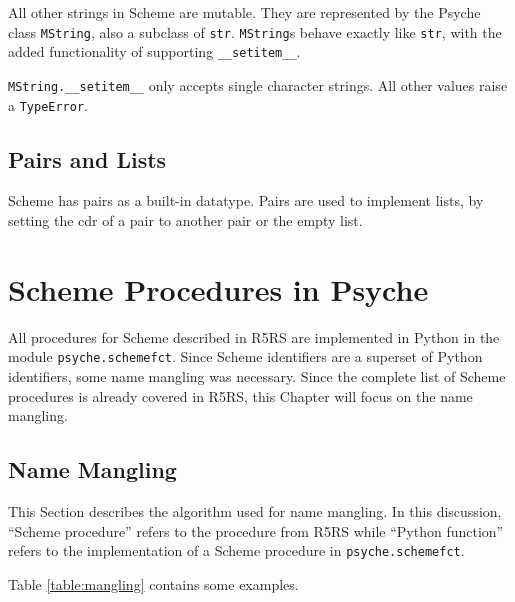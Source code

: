 \documentclass{report}
\newcommand{\code}[1]{\texttt{#1}}
\newcommand{\file}[1]{\texttt{#1}}
\begin{document}
All other strings in Scheme are mutable. They are represented by the
Psyche class \code{MString}, also a subclass of
\code{str}. \code{MString}s behave exactly like \code{str}, with
the added functionality of supporting \code{\_\_setitem\_\_}. 

\code{MString.\_\_setitem\_\_} only accepts single character
strings. All other values raise a \code{TypeError}.


\section{Pairs and Lists}

Scheme has pairs as a built-in datatype. Pairs are used to implement
lists, by setting the cdr of a pair to another pair or the empty
list. 

%
%
\chapter{Scheme Procedures in Psyche}
\label{chap:procedures}
All procedures for Scheme described in R5RS\cite{r5rs} are implemented
in Python in the module \file{psyche.schemefct}. Since Scheme
identifiers are a superset of Python identifiers, some name mangling
was necessary. Since the complete list of Scheme procedures is already
covered in R5RS, this Chapter will focus on the name mangling.


\section{Name Mangling}
This Section describes the algorithm used for name mangling.  In this
discussion, ``Scheme procedure'' refers to the procedure from R5RS
while ``Python function'' refers to the implementation of a Scheme
procedure in \file{psyche.schemefct}.

Table \ref{table:mangling} contains some examples.
\end{document}
